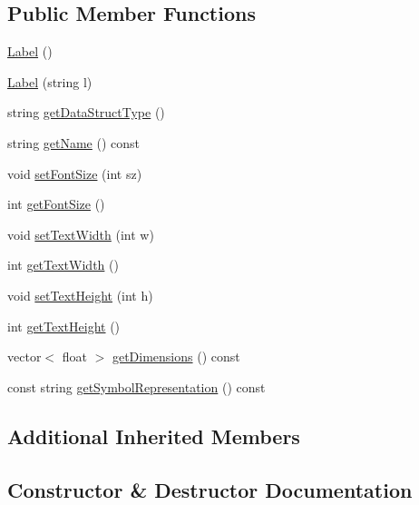\subsection*{Public Member Functions}
\begin{DoxyCompactItemize}
\item 
\hyperlink{classbridges_1_1datastructure_1_1_label_abd73b3f555e6de007b7cb82cdf7c57cd}{Label} ()
\item 
\hyperlink{classbridges_1_1datastructure_1_1_label_a2eacf0820ea29c309f4910db5756607c}{Label} (string l)
\item 
string \hyperlink{classbridges_1_1datastructure_1_1_label_a55ccc4e52bd1f09c55ba6b775e7768ab}{get\+Data\+Struct\+Type} ()
\item 
string \hyperlink{classbridges_1_1datastructure_1_1_label_ac2a15e34404b9b7859e658da63a7020f}{get\+Name} () const
\item 
void \hyperlink{classbridges_1_1datastructure_1_1_label_aee5cc86a51a237c87e56db8e02d271b1}{set\+Font\+Size} (int sz)
\item 
int \hyperlink{classbridges_1_1datastructure_1_1_label_a200cc9710f28af2e63738d5166eaa51f}{get\+Font\+Size} ()
\item 
void \hyperlink{classbridges_1_1datastructure_1_1_label_a323af06f4536c644d6cc265b332b6ad0}{set\+Text\+Width} (int w)
\item 
int \hyperlink{classbridges_1_1datastructure_1_1_label_ab97fecf82c0c21f870f4dc25b6244099}{get\+Text\+Width} ()
\item 
void \hyperlink{classbridges_1_1datastructure_1_1_label_acd095180b94bad422f7c26182680a958}{set\+Text\+Height} (int h)
\item 
int \hyperlink{classbridges_1_1datastructure_1_1_label_aeaf64e048094d69e11e77563c598a045}{get\+Text\+Height} ()
\item 
vector$<$ float $>$ \hyperlink{classbridges_1_1datastructure_1_1_label_a39f904db9e21e038aa4c7cb274f657a5}{get\+Dimensions} () const
\item 
const string \hyperlink{classbridges_1_1datastructure_1_1_label_aa3b7c9e5630ecc8a2534e6db2a220e90}{get\+Symbol\+Representation} () const
\end{DoxyCompactItemize}
\subsection*{Additional Inherited Members}


\subsection{Constructor \& Destructor Documentation}
\mbox{\label{classbridges_1_1datastructure_1_1_label_abd73b3f555e6de007b7cb82cdf7c57cd}} 
